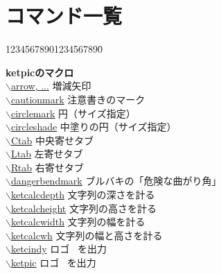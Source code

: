 \documentclass[a4j,12pt,dvipdfmx]{ujarticle}
\newcommand{\bs}{$\backslash$}
\begin{document}
\newpage

\hypertarget{functionlist}{}
\section{コマンド一覧}

\begin{tabbing}
12345678901234567890\=\kill

{\bf ketpicのマクロ} \> \\
\hyperlink{arrow of i or d}{\bs arrow, ...} \> 増減矢印\\
\hyperlink{cautionmark}{\bs cautionmark} \> 注意書きのマーク\\
\hyperlink{circlemark}{\bs circlemark} \> 円（サイズ指定）\\
\hyperlink{circleshade}{\bs circleshade} \> 中塗りの円（サイズ指定）\\
\hyperlink{tab}{\bs Ctab} \> 中央寄せタブ\\
\hyperlink{tab}{\bs Ltab} \> 左寄せタブ\\
\hyperlink{tab}{\bs Rtab} \> 右寄せタブ\\
\hyperlink{dangerbendmark}{\bs dangerbendmark} \> ブルバキの「危険な曲がり角」\\
\hyperlink{ketcalc}{\bs ketcalcdepth} \> 文字列の深さを計る\\
\hyperlink{ketcalc}{\bs ketcalcheight} \> 文字列の高さを計る\\
\hyperlink{ketcalc}{\bs ketcalcwidth} \> 文字列の幅を計る\\
\hyperlink{ketcalcwh}{\bs ketcalcwh} \> 文字列の幅と高さを計る\\
\hyperlink{ketcindy}{\bs ketcindy} \> ロゴ \ketcindy\ を出力\\
\hyperlink{ketpic}{\bs ketpic} \> ロゴ \ketpic\ を出力\\


\end{tabbing}
\end{document}
